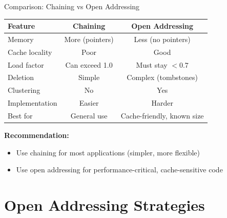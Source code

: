 \documentclass[aspectratio=169]{beamer}
\begin{document}
\begin{frame}{Comparison: Chaining vs Open Addressing}
  \begin{table}
    \centering
    \begin{tabular}{|l|c|c|}
      \hline
      \textbf{Feature} & \textbf{Chaining} & \textbf{Open Addressing} \\
      \hline
      Memory & More (pointers) & Less (no pointers) \\
      \hline
      Cache locality & Poor & Good \\
      \hline
      Load factor & Can exceed 1.0 & Must stay $< 0.7$ \\
      \hline
      Deletion & Simple & Complex (tombstones) \\
      \hline
      Clustering & No & Yes \\
      \hline
      Implementation & Easier & Harder \\
      \hline
      Best for & General use & Cache-friendly, known size \\
      \hline
    \end{tabular}
  \end{table}

  \vspace{0.5cm}
  \textbf{Recommendation:}
  \begin{itemize}
    \item Use chaining for most applications (simpler, more flexible)
    \item Use open addressing for performance-critical, cache-sensitive code
  \end{itemize}
\end{frame}

\section{Open Addressing Strategies}
\end{document}
